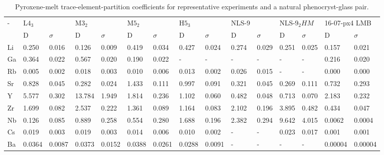 \documentclass[review,authoryear,12pt]{elsarticle}
\begin{document}
\begin{table}[htpb]
\centering
\caption{Pyroxene-melt trace-element-partition coefficients for representative experiments and a natural phenocryst-glass pair.}
\label{D_table}
\begin{adjustbox}{max width=\textwidth}
\begin{tabular}{@{}lllllllllllllll@{}}
\toprule
-  & L$4_3$  &        & M$3_2$  &        & M$5_2$  &        & H$5_3$  &        & NLS-9  &        & \multicolumn{2}{l}{NLS-$9_2 HM$} & \multicolumn{2}{l}{16-07-px4 LMB} \\ 
   & D      & $\sigma$      & D      & $\sigma$      & D      & $\sigma$      & D      & $\sigma$      & D      & $\sigma$      & D              & $\sigma$              & D                & $\sigma$               \\ \midrule
Li & 0.250  & 0.016  & 0.126  & 0.009  & 0.419  & 0.034  & 0.427  & 0.024  & 0.274  & 0.029  & 0.251          & 0.025          & 0.157            & 0.021           \\
Ga & 0.364  & 0.022  & 0.567  & 0.020  & 0.190  & 0.022  & -      & -      & -      & -      & -              & -              & 0.216            & 0.020           \\
Rb & 0.005  & 0.002  & 0.018  & 0.003  & 0.010  & 0.006  & 0.013  & 0.002  & 0.026  & 0.015  & -              & -              & 0.000            & 0.000           \\
Sr & 0.828  & 0.045  & 0.282  & 0.024  & 1.433  & 0.111  & 0.997  & 0.091  & 0.321  & 0.045  & 0.269          & 0.111          & 0.732            & 0.293           \\
Y  & 5.577  & 0.302  & 13.784 & 1.949  & 1.814  & 0.236  & 1.102  & 0.060  & 0.482  & 0.048  & 0.713          & 0.070          & 2.183            & 0.232           \\
Zr & 1.699  & 0.082  & 2.537  & 0.222  & 1.361  & 0.089  & 1.164  & 0.083  & 2.102  & 0.196  & 3.895          & 0.482          & 0.434            & 0.047           \\
Nb & 0.126  & 0.085  & 0.889  & 0.258  & 0.554  & 0.280  & 1.688  & 0.196  & 2.382  & 0.294  & 9.642          & 4.015          & 0.0062           & 0.0004          \\
Cs & 0.019  & 0.003  & 0.019  & 0.003  & 0.014  & 0.006  & 0.010  & 0.002  & -      & -      & 0.023          & 0.017          & 0.001            & 0.001           \\
Ba & 0.0364 & 0.0087 & 0.0373 & 0.0152 & 0.0388 & 0.0261 & 0.0288 & 0.0091 & -      & -      & -              & -              & 0.00004          & 0.00004         \\

\end{tabular}
\end{adjustbox}
\end{table}
\end{document}
